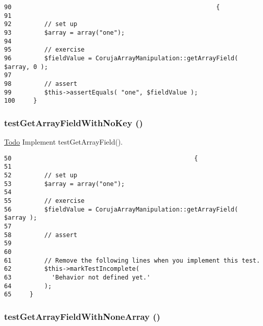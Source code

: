 \begin{Code}\begin{verbatim}90                                                        {
91 
92         // set up
93         $array = array("one");
94 
95         // exercise
96         $fieldValue = CorujaArrayManipulation::getArrayField( $array, 0 );
97 
98         // assert
99         $this->assertEquals( "one", $fieldValue );
100     }
\end{verbatim}
\end{Code}


\hypertarget{class_coruja_array_manipulation_test_8399ad4b91876142e2d69ba6077c04eb}{
\subsubsection[{testGetArrayFieldWithNoKey}]{\setlength{\rightskip}{0pt plus 5cm}testGetArrayFieldWithNoKey ()}}
\label{class_coruja_array_manipulation_test_8399ad4b91876142e2d69ba6077c04eb}


\begin{Desc}
\item[\hyperlink{todo__todo000004}{Todo}]Implement testGetArrayField(). \end{Desc}


\begin{Code}\begin{verbatim}50                                                  {
51 
52         // set up
53         $array = array("one");
54 
55         // exercise
56         $fieldValue = CorujaArrayManipulation::getArrayField( $array );
57 
58         // assert
59 
60 
61         // Remove the following lines when you implement this test.
62         $this->markTestIncomplete(
63           'Behavior not defined yet.'
64         );
65     }
\end{verbatim}
\end{Code}


\hypertarget{class_coruja_array_manipulation_test_48ada181c4be1fc27b5b5542599ac884}{
\subsubsection[{testGetArrayFieldWithNoneArray}]{\setlength{\rightskip}{0pt plus 5cm}testGetArrayFieldWithNoneArray ()}}
\label{class_coruja_array_manipulation_test_48ada181c4be1fc27b5b5542599ac884}


